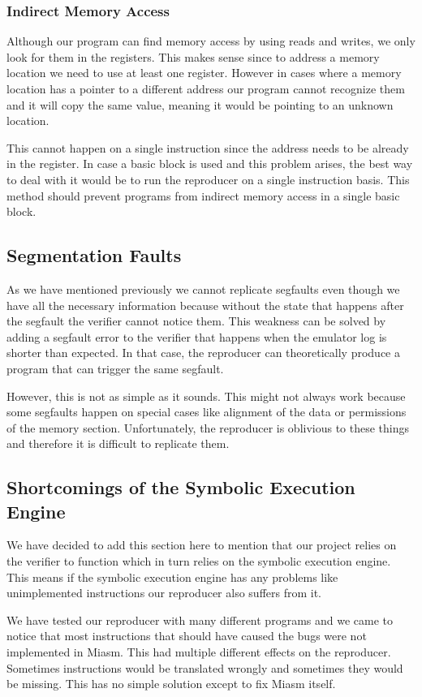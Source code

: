 \subsubsection{Indirect Memory Access}
Although our program can find memory access by using reads and writes, we only look for them in the registers.
This makes sense since to address a memory location we need to use at least one register.
However in cases where a memory location has a pointer to a different address our program cannot recognize them and it will copy the same value, meaning it would be pointing to an unknown location.

This cannot happen on a single instruction since the address needs to be already in the register.
In case a basic block is used and this problem arises, the best way to deal with it would be to run the reproducer on a single instruction basis.
This method should prevent programs from indirect memory access in a single basic block. 

\subsection{Segmentation Faults}
As we have mentioned previously we cannot replicate \ac{segfault}s even though we have all the necessary information because without the state that happens after the \ac{segfault} the verifier cannot notice them.
This weakness can be solved by adding a \ac{segfault} error to the verifier that happens when the emulator log is shorter than expected.
In that case, the reproducer can theoretically produce a program that can trigger the same \ac{segfault}.

However, this is not as simple as it sounds.
This might not always work because some \ac{segfault}s happen on special cases like alignment of the data or permissions of the memory section.
Unfortunately, the reproducer is oblivious to these things and therefore it is difficult to replicate them.

\subsection{Shortcomings of the Symbolic Execution Engine}
We have decided to add this section here to mention that our project relies on the verifier to function which in turn relies on the symbolic execution engine.
This means if the symbolic execution engine has any problems like unimplemented instructions our reproducer also suffers from it.

We have tested our reproducer with many different programs and we came to notice that most instructions that should have caused the bugs were not implemented in Miasm.
This had multiple different effects on the reproducer.
Sometimes instructions would be translated wrongly and sometimes they would be missing.
This has no simple solution except to fix Miasm itself.
